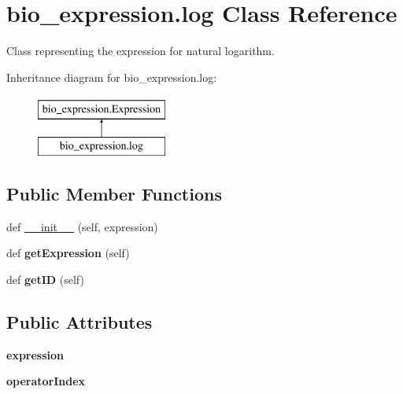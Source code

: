 \hypertarget{classbio__expression_1_1log}{}\section{bio\+\_\+expression.\+log Class Reference}
\label{classbio__expression_1_1log}


Class representing the expression for natural logarithm.  


Inheritance diagram for bio\+\_\+expression.\+log\+:\begin{figure}[H]
\begin{center}
\leavevmode
\includegraphics[height=2.000000cm]{classbio__expression_1_1log}
\end{center}
\end{figure}
\subsection*{Public Member Functions}
\begin{DoxyCompactItemize}
\item 
def \hyperlink{classbio__expression_1_1log_aced179b6a903069882c1e1dafa8a6f53}{\+\_\+\+\_\+init\+\_\+\+\_\+} (self, expression)
\item 
def {\bfseries get\+Expression} (self)\hypertarget{classbio__expression_1_1log_a7935d592b06e99bd757a20f136dc63a3}{}\label{classbio__expression_1_1log_a7935d592b06e99bd757a20f136dc63a3}

\item 
def {\bfseries get\+ID} (self)\hypertarget{classbio__expression_1_1log_a60db0a0d2c365d553595837c663f6a0c}{}\label{classbio__expression_1_1log_a60db0a0d2c365d553595837c663f6a0c}

\end{DoxyCompactItemize}
\subsection*{Public Attributes}
\begin{DoxyCompactItemize}
\item 
{\bfseries expression}\hypertarget{classbio__expression_1_1log_a03faf6253c7c30504051d884068672a3}{}\label{classbio__expression_1_1log_a03faf6253c7c30504051d884068672a3}

\item 
{\bfseries operator\+Index}\hypertarget{classbio__expression_1_1log_a2d3c8babc9e04c6a807449be5db7b712}{}\label{classbio__expression_1_1log_a2d3c8babc9e04c6a807449be5db7b712}

\end{DoxyCompactItemize}


